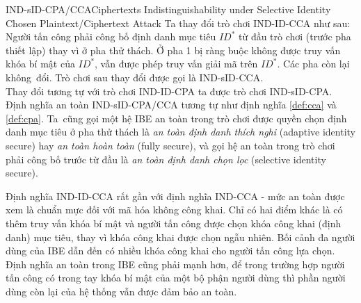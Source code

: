 \documentclass[class=report, crop=false]{standalone}
\begin{document}
			\begin{game}{IND-sID-CPA/CCA}{Ciphertexts Indistinguishability under Selective Identity Chosen Plaintext/Ciphertext Attack}
				Ta thay đổi trò chơi IND-ID-CCA như sau: \\[0.2\baselineskip] \indent
				Người tấn công \adversary phải công bố định danh mục tiêu $ID^*$ từ đầu trò chơi (trước pha thiết lập) thay vì ở pha thử thách. Ở pha 1 \adversary bị ràng buộc không được truy vấn khóa bí mật của $ID^*$, \challenger vẫn được phép truy vấn giải mã trên $ID^*$. Các pha còn lại không~đổi. Trò chơi sau thay đổi được gọi là IND-sID-CCA. \\[0.2\baselineskip] \indent
				Thay đổi tương tự với trò chơi IND-ID-CPA ta được trò chơi IND-sID-CPA. \\ \indent
				Định nghĩa an toàn IND-sID-CPA/CCA tương tự như định nghĩa \ref{def:cca} và \ref{def:cpa}. Ta~cũng gọi một hệ IBE an toàn trong trò chơi \adversary được quyền chọn định danh mục tiêu ở pha thử thách là \textit{an toàn định danh thích nghi} (adaptive identity secure) hay \textit{an toàn hoàn toàn} (fully secure), và gọi hệ an toàn trong trò chơi \adversary phải công bố trước từ đầu là \textit{an toàn định danh chọn lọc} (selective identity secure).
			\end{game}
			\vspace{\baselineskip}
			\begin{remark}
				Định nghĩa IND-ID-CCA rất gần với định nghĩa IND-CCA - mức an toàn được xem là chuẩn mực đối với mã hóa không công khai. Chỉ có hai điểm khác là có thêm truy vấn khóa bí mật và người tấn công được chọn khóa công khai (định danh) mục tiêu, thay vì khóa công khai được chọn ngẫu nhiên. Bối cảnh đa người dùng của IBE dẫn đến có nhiều khóa công khai cho người tấn công lựa chọn. Định nghĩa an toàn trong IBE cũng phải mạnh hơn, để trong trường hợp người tấn công có trong tay khóa bí mật của một bộ phận người dùng thì phần người dùng còn lại của hệ thống vẫn được đảm bảo an toàn.
			\end{remark}
\end{document}
